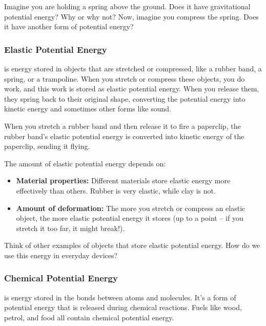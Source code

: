 \begin{stopandthink}
Imagine you are holding a spring above the ground. Does it have gravitational potential energy? Why or why not? Now, imagine you compress the spring. Does it have another form of potential energy?
\end{stopandthink}


\subsubsection{Elastic Potential Energy}

 is energy stored in objects that are stretched or compressed, like a rubber band, a spring, or a trampoline. When you stretch or compress these objects, you do work, and this work is stored as elastic potential energy.  When you release them, they spring back to their original shape, converting the potential energy into kinetic energy and sometimes other forms like sound.

\begin{example}
When you stretch a rubber band and then release it to fire a paperclip, the rubber band’s elastic potential energy is converted into kinetic energy of the paperclip, sending it flying.
\end{example}

The amount of elastic potential energy depends on:

\begin{itemize}
    \item \textbf{Material properties:}  Different materials store elastic energy more effectively than others. Rubber is very elastic, while clay is not.
    \item \textbf{Amount of deformation:} The more you stretch or compress an elastic object, the more elastic potential energy it stores (up to a point – if you stretch it too far, it might break!).
\end{itemize}

\begin{stopandthink}
Think of other examples of objects that store elastic potential energy. How do we use this energy in everyday devices?
\end{stopandthink}


\subsubsection{Chemical Potential Energy}

 is energy stored in the bonds between atoms and molecules.  It’s a form of potential energy that is released during chemical reactions.  Fuels like wood, petrol, and food all contain chemical potential energy.


